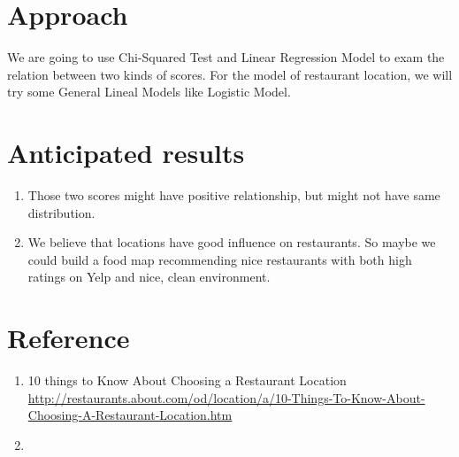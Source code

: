 \documentclass{article}
\begin{document}
\section{Approach}
We are going to use Chi-Squared Test and Linear Regression Model to exam the relation between two kinds of scores. For the model of restaurant location, we will try some General Lineal Models like Logistic Model.

\section{Anticipated results}
\begin{enumerate}
  \item Those two scores might have positive relationship, but might not have same distribution.
  \item We believe that locations have good influence on restaurants. So maybe we could build a food map recommending nice restaurants with both high ratings on Yelp and nice, clean environment. 

\end{enumerate}



\section{Reference}
\begin{enumerate}
  \item10 things to Know About Choosing a Restaurant Location \url{http://restaurants.about.com/od/location/a/10-Things-To-Know-About-Choosing-A-Restaurant-Location.htm}
  \item
\end{enumerate}
\end{document}
